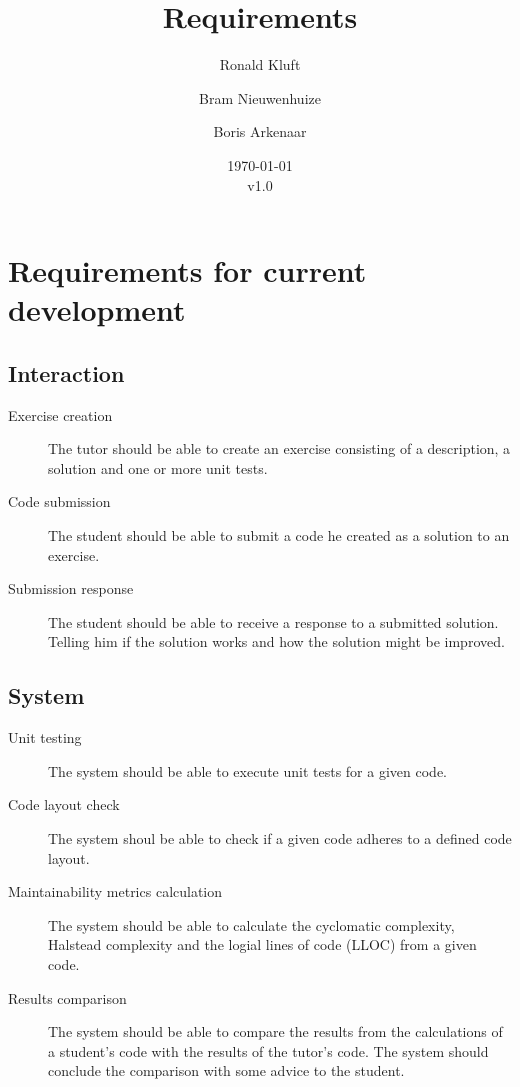 \documentclass{article}
\begin{document}
\title{Requirements}
\author{Ronald Kluft \and Bram Nieuwenhuize \and Boris Arkenaar}
\date{\today\\v1.0}
\maketitle

\section{Requirements for current development}

\subsection{Interaction}
\begin{description}
  \item[Exercise creation] The tutor should be able to create an exercise
    consisting of a description, a solution and one or more unit tests.
  \item[Code submission] The student should be able to submit a code he
    created as a solution to an exercise.
  \item[Submission response] The student should be able to receive a response
    to a submitted solution. Telling him if the solution works and how the
    solution might be improved.
\end{description}

\subsection{System}
\begin{description}
  \item[Unit testing] The system should be able to execute unit tests for a
    given code.
  \item[Code layout check] The system shoul be able to check if a given code
    adheres to a defined code layout.
  \item[Maintainability metrics calculation] The system should be able to
    calculate the cyclomatic complexity, Halstead complexity and the logial
    lines of code (LLOC) from a given code.
  \item[Results comparison] The system should be able to compare the results
    from the calculations of a student's code with the results of the tutor's
    code. The system should conclude the comparison with some advice to the
    student.
\end{description}
\end{document}
